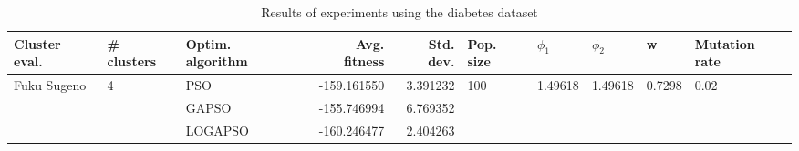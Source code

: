 \begin{table}
\centering
\caption{Results of experiments using the diabetes dataset}
\begin{tabular}{lllrrlllll}
\toprule
               Cluster eval. &        \# clusters & Optim. algorithm &  Avg. fitness &  Std. dev. &            Pop. size &               $\phi_{1}$ &               $\phi_{2}$ &                       w &         Mutation rate \\
\midrule
\multirow{3}{*}{Fuku Sugeno} & \multirow{3}{*}{4} &              PSO &   -159.161550 &   3.391232 & \multirow{3}{*}{100} & \multirow{3}{*}{1.49618} & \multirow{3}{*}{1.49618} & \multirow{3}{*}{0.7298} & \multirow{3}{*}{0.02} \\
                             &                    &            GAPSO &   -155.746994 &   6.769352 &                      &                          &                          &                         &                       \\
                             &                    &          LOGAPSO &   -160.246477 &   2.404263 &                      &                          &                          &                         &                       \\
\bottomrule
\end{tabular}
\end{table}
